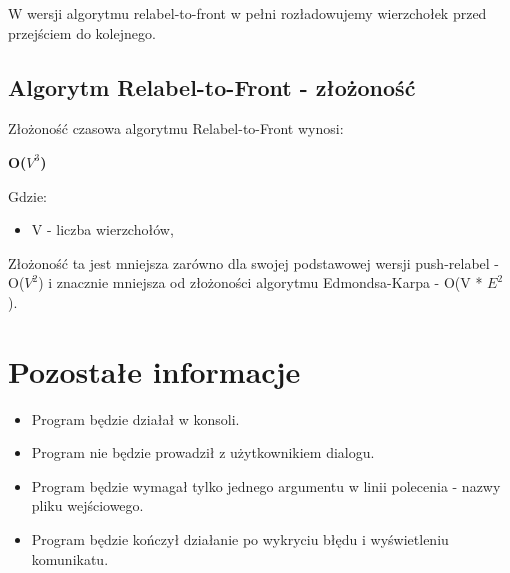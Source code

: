 \documentclass{article}
\begin{document}
{\begin{enumerate}
\begin{enumerate}
        
            W wersji algorytmu relabel-to-front w pełni rozładowujemy wierzchołek przed przejściem do kolejnego.

        \end{enumerate}
        
        \subsection{Algorytm Relabel-to-Front - złożoność}
            Złożoność czasowa algorytmu Relabel-to-Front wynosi:
            
            \textbf{O($V^3$)}
            
            Gdzie:
            \begin{itemize}
                \item V - liczba wierzchołów,
            \end{itemize}
            
            Złożoność ta jest mniejsza zarówno dla swojej podstawowej wersji push-relabel - O($V^2$) i znacznie mniejsza od złożoności algorytmu Edmondsa-Karpa - O(V * $E^2$).
        
    \end{enumerate}

}


\section{Pozostałe informacje}
{\fontsize{13}{13}\selectfont
    \begin{itemize}
        \item Program będzie działał w konsoli.
        \item Program nie będzie prowadził z użytkownikiem dialogu.
        \item Program będzie wymagał tylko jednego argumentu w linii polecenia - nazwy pliku wejściowego.
        \item Program będzie kończył działanie po wykryciu błędu i wyświetleniu komunikatu.
        
    \end{itemize} 

}
\end{document}
